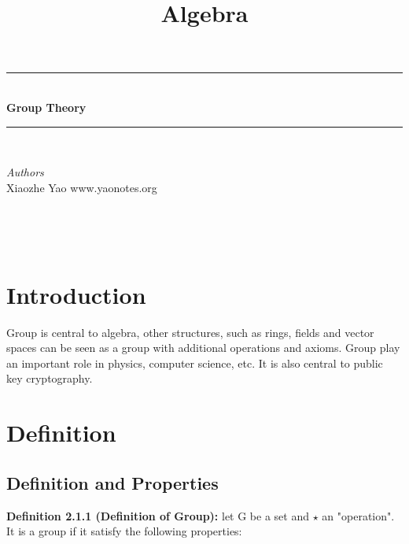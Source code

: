 \documentclass[12pt,openany]{book}
\title{Algebra}
\theoremstyle{definition}
\theoremstyle{definition}
\newcommand{\HRule}{\rule{\linewidth}{0.5mm}} %
\begin{document}
 

\begin{center}
\HRule \\[0.4cm]
{ \huge \bfseries Group Theory}\\[0.4cm] %
\HRule \\[1.5cm]
\begin{minipage}{0.4\textwidth}
\begin{flushleft} \large
\emph{Authors}\\
Xiaozhe Yao \newline
www.yaonotes.org \newline

\end{flushleft}
\end{minipage}
~
\begin{minipage}{0.4\textwidth}
\begin{flushright} \large

\end{flushright}
\end{minipage}\\[0.5cm]
\end{center}

\chapter{Introduction}

Group is central to algebra, other structures, such as rings, fields and vector spaces can be seen as a group with additional operations and axioms. Group play an important role in physics, computer science, etc. It is also central to public key cryptography.

\chapter{Definition}

\section{Definition and Properties}

\noindent\textbf{Definition 2.1.1 (Definition of Group):} let G be a set and $\star$ an "operation". It is a group if it satisfy the following properties:
\end{document}
